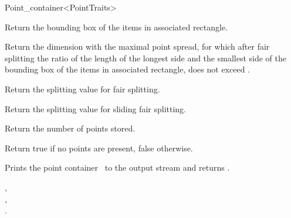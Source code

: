 \begin{ccRefClass}{Point_container<PointTraits>}
\begin{ccAdvanced}
{Return the bounding box of the items in associated rectangle.}

{Return the dimension with the maximal point spread, for which after fair splitting
the ratio of the length of the longest side and the smallest side of the bounding box of
the items in associated rectangle,
does not exceed .}

{Return the splitting value for fair splitting.}

{Return the splitting value for sliding fair splitting.}

{
Return the number of points stored.
}

{
Return true if no points are present, false otherwise.
}





{Prints the point container \ccVar\ to the output stream  and returns .}


\ccSeeAlso

,\\
,\\
.

\end{ccAdvanced}
\end{ccRefClass}


